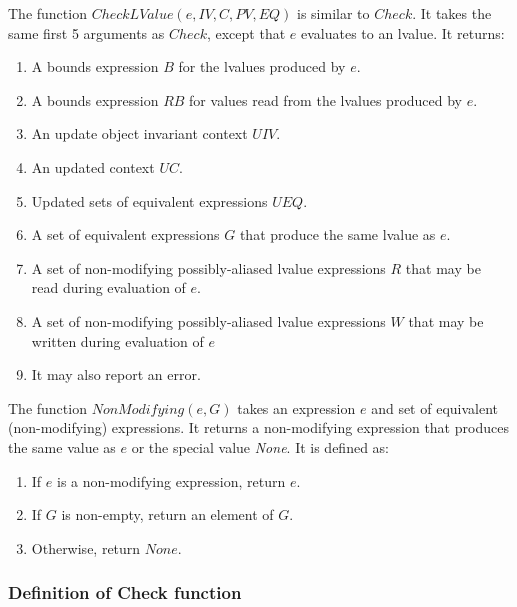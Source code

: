 The function $CheckLValue(e, IV, C, PV, EQ)$ is similar to $Check$.  It takes the
same first 5 arguments as $Check$, except that $e$ evaluates to an lvalue.
It returns:
\begin{enumerate}
\item A bounds expression $B$ for the lvalues produced by $e$.
\item A bounds expression $RB$ for values read from the lvalues produced by $e$.
\item An update object invariant context $UIV$.
\item An updated context $\mathit{UC}$.
\item Updated sets of equivalent expressions $UEQ$.
\item A set of equivalent expressions $G$ that produce the same lvalue as $e$.
\item A set of non-modifying possibly-aliased lvalue expressions $R$ that may be read during evaluation of
        $e$.
\item A set of non-modifying possibly-aliased lvalue expressions $W$ that may be written during evaluation of
        $e$
\item It may also report an error.
\end{enumerate}

The function $NonModifying(e, G)$ takes an expression $e$ and set of equivalent (non-modifying)
expressions.  It returns a non-modifying expression that produces the same value as $e$ or
the special value {\it None}.  It is defined as:
\begin{enumerate}
\item If $e$ is a non-modifying expression, return $e$.
\item If $G$ is non-empty, return an element of $G$.
\item Otherwise, return $None$.
\end{enumerate}

\subsubsection{Definition of Check function}

